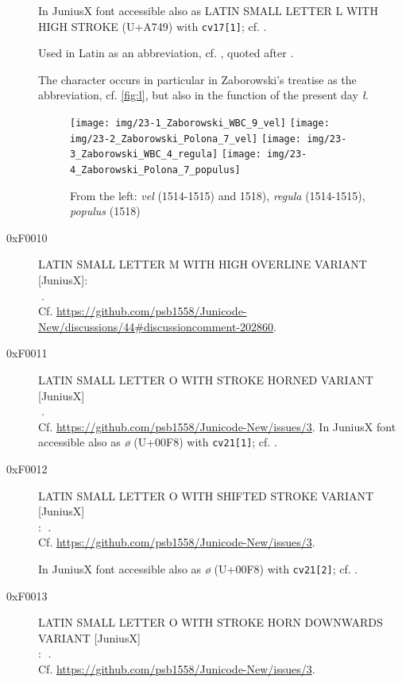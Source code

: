 \documentclass{article}
\newcommand{\Jglyph}[1]{{\relsize{2}\J#1}}
\begin{document}
\begin{description}
  In JuniusX font accessible also as
  LATIN SMALL LETTER L WITH HIGH STROKE
  (U+A749) with \texttt{cv17[1]};
  cf. \autocite[p. 9]{baker20:_opent_featur_junius_junius}.

  Used in Latin as an abbreviation, cf. \autocite{balbi1460:_cathol},
  quoted after \autocite[s. 6]{N3027}. 
  
  The character occurs in particular in Zaborowski's treatise as the
  abbreviation, cf. \vref{fig:l}, but also in the function of the
  present day \textit{ł}.

  \begin{figure}[h]
    \centering
    \texttt{[image: img/23-1\_Zaborowski\_WBC\_9\_vel]}
    \texttt{[image: img/23-2\_Zaborowski\_Polona\_7\_vel]}
    \texttt{[image: img/23-3\_Zaborowski\_WBC\_4\_regula]}
    \texttt{[image: img/23-4\_Zaborowski\_Polona\_7\_populus]}
    \caption{From the left: \textit{vel} (1514-1515) and 1518), \textit{regula} (1514-1515), \textit{populus} (1518)}
    \label{fig:l}
  \end{figure}
  
\item [0xF0010] LATIN SMALL LETTER M WITH HIGH OVERLINE VARIANT [JuniusX]:\\
  \Jglyph{󰀐}.\\ Cf. \url{https://github.com/psb1558/Junicode-New/discussions/44#discussioncomment-202860}.
 \item [0xF0011] LATIN SMALL LETTER O WITH STROKE HORNED VARIANT [JuniusX]\\
  \Jglyph{󰀑}.\\  Cf. \url{https://github.com/psb1558/Junicode-New/issues/3}.
  In JuniusX font accessible also as \textit{ø} (U+00F8) with \texttt{cv21[1]};
  cf. \autocite[p. 9]{baker20:_opent_featur_junius_junius}.
\item [0xF0012] LATIN SMALL LETTER O WITH SHIFTED STROKE VARIANT [JuniusX]\\:
  \Jglyph{󰀒}.\\  Cf. \url{https://github.com/psb1558/Junicode-New/issues/3}.

  In JuniusX font accessible also as \textit{ø} (U+00F8) with \texttt{cv21[2]};
  cf. \autocite[p. 9]{baker20:_opent_featur_junius_junius}.
\item [0xF0013] LATIN SMALL LETTER O WITH STROKE HORN DOWNWARDS VARIANT [JuniusX]\\:
  \Jglyph{󰀓}.\\  Cf. \url{https://github.com/psb1558/Junicode-New/issues/3}.


\end{description}
\end{document}
